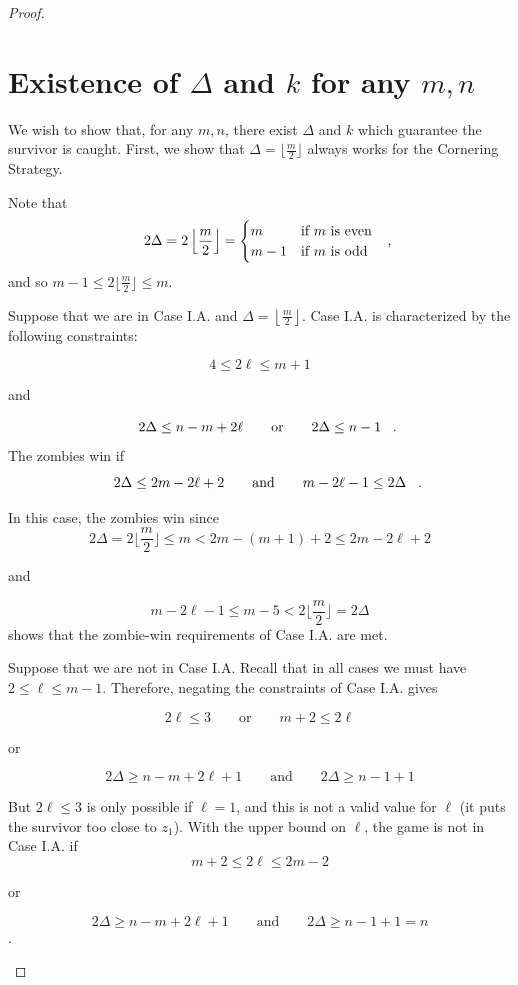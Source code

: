 \begin{proof}
\begin{proofpart}
\end{proofpart}

\section{Existence of $\Delta$ and $k$ for any $m,n$ \label{thm q_m_n 3}}

\begin{proofpart}
We wish to show that, for any $m, n$, there exist $\Delta$ and $k$
which guarantee the survivor is caught.
First, we show that $\Delta = \lfloor \frac{m}{2} \rfloor$ always
works for the Cornering Strategy.

Note that
\[
2\Delta = 2 \left\lfloor \frac{m}{2} \right\rfloor =
\begin{cases}
m & \text{if $m$ is even} \\
m -1 & \text{if $m$ is odd}
\end{cases} \mcomma
\]
and so $m -1 \leq 2 \lfloor \frac{m}{2} \rfloor \leq m$.

Suppose that we are in Case I.A. and $\Delta = \left\lfloor \frac{m}{2} \right\rfloor$.
Case I.A. is characterized by the following constraints:

\[ 4 \leq 2 \ell \leq m+1 \]
\begin{center}and\end{center}
\[ 2\Delta \leq n - m + 2\ell \qquad \text{or} \qquad 2\Delta \leq n-1 \mperiod \]
The zombies win if
\[ 2 \Delta \leq 2 m- 2 \ell + 2 \qquad \text{and} \qquad m - 2\ell  -1 \leq 2 \Delta \mperiod \]

In this case, the zombies win since
\[ 2 \Delta = 2 \lfloor \frac{m}{2} \rfloor \leq m < 2m - (m+1) + 2\leq 2 m- 2 \ell + 2 \]
\begin{center}and\end{center}
\[ m - 2\ell -1 \leq m - 5 < 2 \lfloor \frac{m}{2} \rfloor = 2 \Delta \]
shows that the zombie-win requirements of Case I.A. are met.

Suppose that we are not in Case I.A. Recall that in all cases we must have $2 \leq \ell \leq m-1$. Therefore, negating the constraints of Case I.A. gives

\[2\ell \leq 3 \qquad \text{or} \qquad m+2 \leq 2 \ell \]
\begin{center}or\end{center}
\[ 2\Delta \geq n - m + 2\ell +1 \qquad \text{and} \qquad 2 \Delta \geq n - 1 + 1 \]

But $2\ell \leq 3$ is only possible if $\ell = 1$, and this is not a valid value for $\ell$ (it puts the survivor too close to $z_1$). With the upper bound on $\ell$, the game is not in Case I.A. if
\[m+2 \leq 2 \ell \leq 2m-2\]
\begin{center}or\end{center}
\[ 2\Delta \geq n - m + 2\ell +1 \qquad \text{and} \qquad 2 \Delta \geq n - 1 + 1 = n \tag{*} \label{not i a}\].


\end{proofpart}
\end{proof}
